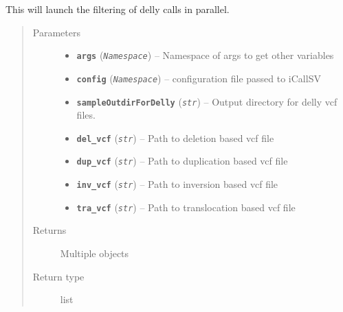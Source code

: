 \documentclass[letterpaper,10pt,english]{sphinxmanual}
\begin{document}
\begin{fulllineitems}
\label{iCallSV:iCallSV.launch_FilterDellyCalls.launch_filterdellycalls_for_different_analysis_type}
This will launch the filtering of delly calls in parallel.
\begin{quote}\begin{description}
\item[{Parameters}] \leavevmode\begin{itemize}
\item {} 
\textbf{\texttt{args}} (\emph{\texttt{Namespace}}) -- Namespace of args to get other variables

\item {} 
\textbf{\texttt{config}} (\emph{\texttt{Namespace}}) -- configuration file passed to iCallSV

\item {} 
\textbf{\texttt{sampleOutdirForDelly}} (\emph{\texttt{str}}) -- Output directory for delly vcf files.

\item {} 
\textbf{\texttt{del\_vcf}} (\emph{\texttt{str}}) -- Path to deletion based vcf file

\item {} 
\textbf{\texttt{dup\_vcf}} (\emph{\texttt{str}}) -- Path to duplication based vcf file

\item {} 
\textbf{\texttt{inv\_vcf}} (\emph{\texttt{str}}) -- Path to inversion based vcf file

\item {} 
\textbf{\texttt{tra\_vcf}} (\emph{\texttt{str}}) -- Path to translocation based vcf file

\end{itemize}

\item[{Returns}] \leavevmode
Multiple objects

\item[{Return type}] \leavevmode
list

\end{description}\end{quote}

\end{fulllineitems}
\end{document}
